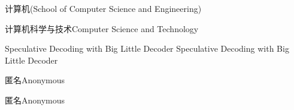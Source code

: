 
\school
{计算机}{(School of Computer Science and Engineering)}

\major
{计算机科学与技术}{Computer Science and Technology}

\thesistitle
{Speculative Decoding with Big Little Decoder}
{}
{Speculative Decoding with Big Little Decoder}
{}

\thesisauthor
{匿名}{Anonymous}

\teacher
{匿名}{Anonymous}






